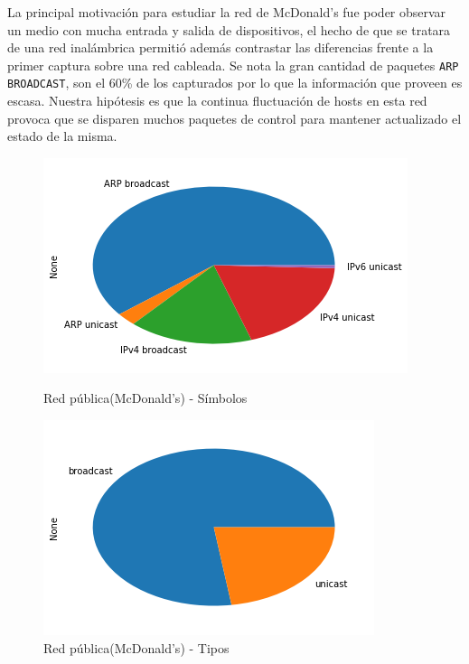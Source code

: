 La principal motivación para estudiar la red de McDonald's fue poder observar un medio con mucha entrada y salida de dispositivos, el hecho de que se tratara de una red inalámbrica permitió además contrastar las diferencias frente a la primer captura sobre una red cableada. Se nota la gran cantidad de paquetes \texttt{ARP BROADCAST}, son el 60\% de los capturados por lo que la información que proveen es escasa. Nuestra hipótesis es que la continua fluctuación de hosts en esta red provoca que se disparen muchos paquetes de control para mantener actualizado el estado de la misma. 

\begin{figure}[H]
	\begin{minipage}{0.49\textwidth}
		\centering
		\includegraphics[width=\linewidth]{imagenes/mac_torta_simbolos}
		\caption{Red pública(McDonald's) - Símbolos}
		\label{mac_torta_simb}
	\end{minipage}
	\begin{minipage}{0.49\textwidth}
		\centering
		\includegraphics[width=\linewidth]{imagenes/mac_torta_tipos}
		\caption{Red pública(McDonald's) - Tipos}
		\label{mac_torta_tipos}
	\end{minipage}
\end{figure}

